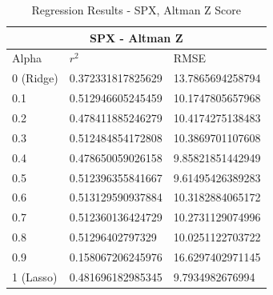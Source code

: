 \begin{table}[h!]
\centering
\begin{tabular}{ |p{2.5cm}||p{4cm}|p{4cm}| }
 \hline
 \multicolumn{3}{|c|}{SPX - Altman Z} \\
 \hline
 Alpha & $r^2$ & RMSE \\
 \hline
0 (Ridge) & 0.372331817825629 & 13.7865694258794\\
0.1 & 0.512946605245459 & 10.1747805657968\\
0.2 & 0.478411885246279 & 10.4174275138483\\
0.3 & 0.512484854172808 & 10.3869701107608\\
0.4 & 0.478650059026158 & 9.85821851442949\\
0.5 & 0.512396355841667 & 9.61495426389283\\
0.6 & 0.513129590937884 & 10.3182884065172\\
0.7 & 0.512360136424729 & 10.2731129074996\\
0.8 & 0.51296402797329 & 10.0251122703722\\
\rowcolor{gray}0.9 & 0.158067206245976 & 16.6297402971145\\
1 (Lasso) & 0.481696182985345 & 9.7934982676994\\
 \hline
\end{tabular}
\caption{Regression Results  - SPX, Altman Z Score}
\end{table}


